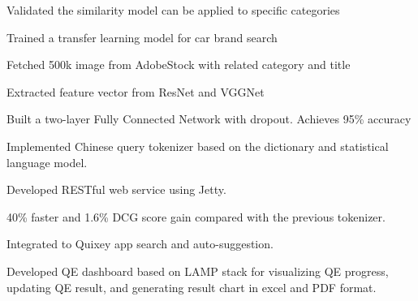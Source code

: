 \documentclass[letterpaper]{deedy-resume} %
\begin{document}
\begin{minipage}[t]{0.66\textwidth}
\sectionspace %

\begin{tightitemize}
\item Validated the similarity model can be applied to specific categories
\item Trained a transfer learning model for car brand search
\item Fetched 500k image from AdobeStock with related category and title
\item Extracted feature vector from ResNet and VGGNet
\item Built a two-layer Fully Connected Network with dropout. Achieves 95\% accuracy
\end{tightitemize}

\sectionspace



\sectionspace

\begin{tightitemize}
\item Implemented Chinese query tokenizer based on the dictionary and statistical language model. 
\item Developed RESTful web service using Jetty.
\item 40\% faster and 1.6\% DCG score gain compared with the previous tokenizer.
\item Integrated to Quixey app search and auto-suggestion.
\end{tightitemize}

\sectionspace %



\sectionspace

\begin{tightitemize}
\item Developed QE dashboard based on LAMP stack for visualizing QE progress, updating QE result, and generating result chart in excel and PDF format.
\end{tightitemize}

\sectionspace %


\end{minipage} %
\end{document}

